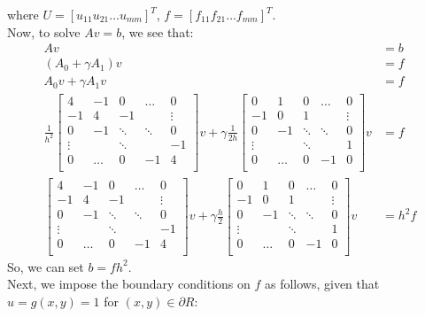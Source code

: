 \documentclass[12pt]{article}
\begin{document}
where $U = [u_{11} u_{21} \dots u_{mm}]^T$, $f = [f_{11} f_{21} \dots f_{mm}]^T$.\\
Now, to solve $Av = b$, we see that:
\begin{align*}
Av &= b \\
(A_0 + \gamma A_1)v &= f \\
A_0v + \gamma A_1v &= f \\
\frac{1}{h^2}\begin{bmatrix}
4 & -1 & 0 & \hdots & 0 \\
-1 & 4 & -1 &  & \vdots\\
0 & -1 & \ddots & \ddots & 0\\
\vdots &  & \ddots & & -1 \\
0 & \hdots & 0 & -1 & 4 \\
\end{bmatrix}v + \gamma \frac{1}{2h}\begin{bmatrix}
0 & 1 & 0 & \hdots & 0 \\
-1 & 0 & 1 &  & \vdots\\
0 & -1 & \ddots & \ddots & 0\\
\vdots &  & \ddots & & 1 \\
0 & \hdots & 0 & -1 & 0 \\
\end{bmatrix}v &= f \\
\begin{bmatrix}
4 & -1 & 0 & \hdots & 0 \\
-1 & 4 & -1 &  & \vdots\\
0 & -1 & \ddots & \ddots & 0\\
\vdots &  & \ddots & & -1 \\
0 & \hdots & 0 & -1 & 4 \\
\end{bmatrix}v + \gamma \frac{h}{2}\begin{bmatrix}
0 & 1 & 0 & \hdots & 0 \\
-1 & 0 & 1 &  & \vdots\\
0 & -1 & \ddots & \ddots & 0\\
\vdots &  & \ddots & & 1 \\
0 & \hdots & 0 & -1 & 0 \\
\end{bmatrix}v &= h^2f 
\end{align*}
So, we can set $b = fh^2$.\\
Next, we impose the boundary conditions on $f$ as follows, given that $ u = g(x,y) = 1$ for $(x,y) \in \partial R$:
\end{document}
